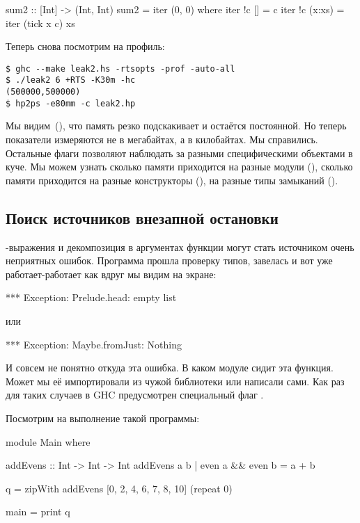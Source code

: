 

\begin{code}
sum2 :: [Int] -> (Int, Int)
sum2 = iter (0, 0)
    where iter !c  []     = c
          iter !c  (x:xs) = iter (tick x c) xs
\end{code}

Теперь снова посмотрим на профиль:


\begin{verbatim}
$ ghc --make leak2.hs -rtsopts -prof -auto-all
$ ./leak2 6 +RTS -K30m -hc
(500000,500000)
$ hp2ps -e80mm -c leak2.hp
\end{verbatim}

Мы видим~(), что память резко подскакивает и остаётся
постоянной. Но теперь показатели измеряются не в мегабайтах, а в
килобайтах. Мы справились. Остальные флаги  позволяют наблюдать
за разными специфическими объектами в куче. Мы можем узнать сколько
памяти приходится на разные модули (), сколько памяти приходится
на разные конструкторы (), на разные типы замыканий ().


\subsection{Поиск источников внезапной остановки}

-выражения и декомпозиция в аргументах функции могут стать
источником очень неприятных ошибок. Программа прошла проверку типов,
завелась и вот уже работает-работает как вдруг мы видим на экране:


\begin{code}
*** Exception: Prelude.head: empty list
\end{code}

или


\begin{code}
*** Exception: Maybe.fromJust: Nothing
\end{code}

И совсем не понятно откуда эта ошибка. В каком модуле сидит эта функция.
Может мы её импортировали из чужой библиотеки или написали сами. Как раз
для таких случаев в GHC предусмотрен специальный флаг .

Посмотрим на выполнение такой программы:


\begin{code}
module Main where

addEvens :: Int -> Int -> Int
addEvens a b 
    | even a && even b = a + b

q = zipWith addEvens [0, 2, 4, 6, 7, 8, 10] (repeat 0)

main = print q
\end{code}

